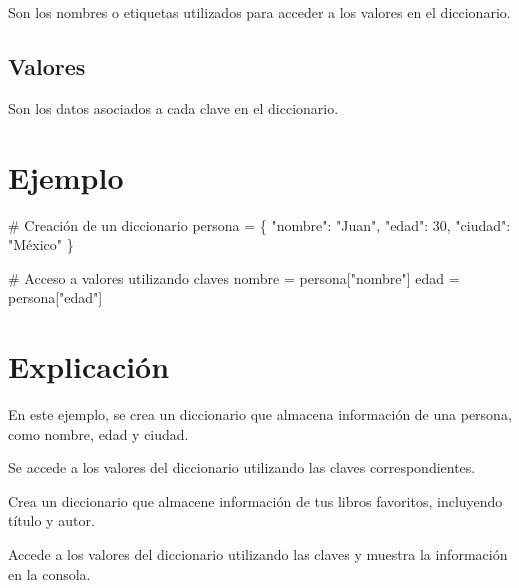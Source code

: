 \documentclass[
  a4paper,
  DIV=11,
  numbers=noendperiod,
  onepage,
  openany]{scrreprt}
\newenvironment{Shaded}{\begin{snugshade}}{\end{snugshade}}
\newcommand{\CommentTok}[1]{\textcolor[rgb]{0.37,0.37,0.37}{#1}}
\newcommand{\DecValTok}[1]{\textcolor[rgb]{0.68,0.00,0.00}{#1}}
\newcommand{\NormalTok}[1]{\textcolor[rgb]{0.00,0.23,0.31}{#1}}
\newcommand{\OperatorTok}[1]{\textcolor[rgb]{0.37,0.37,0.37}{#1}}
\newcommand{\StringTok}[1]{\textcolor[rgb]{0.13,0.47,0.30}{#1}}
\begin{document}
Son los nombres o etiquetas utilizados para acceder a los valores en el
diccionario.

\hypertarget{valores}{%
\subsection{Valores}\label{valores}}

Son los datos asociados a cada clave en el diccionario.

\hypertarget{ejemplo-24}{%
\section{Ejemplo}\label{ejemplo-24}}

\begin{Shaded}
\begin{Highlighting}[]
\CommentTok{\# Creación de un diccionario}
\NormalTok{persona }\OperatorTok{=}\NormalTok{ \{}
    \StringTok{"nombre"}\NormalTok{: }\StringTok{"Juan"}\NormalTok{,}
    \StringTok{"edad"}\NormalTok{: }\DecValTok{30}\NormalTok{,}
    \StringTok{"ciudad"}\NormalTok{: }\StringTok{"México"}
\NormalTok{\}}

\CommentTok{\# Acceso a valores utilizando claves}
\NormalTok{nombre }\OperatorTok{=}\NormalTok{ persona[}\StringTok{"nombre"}\NormalTok{]}
\NormalTok{edad }\OperatorTok{=}\NormalTok{ persona[}\StringTok{"edad"}\NormalTok{]}
\end{Highlighting}
\end{Shaded}

\hypertarget{explicaciuxf3n-24}{%
\section{Explicación}\label{explicaciuxf3n-24}}

En este ejemplo, se crea un diccionario que almacena información de una
persona, como nombre, edad y ciudad.

Se accede a los valores del diccionario utilizando las claves
correspondientes.

\begin{tcolorbox}[enhanced jigsaw, colbacktitle=quarto-callout-important-color!10!white, toprule=.15mm, leftrule=.75mm, titlerule=0mm, opacityback=0, rightrule=.15mm, opacitybacktitle=0.6, breakable, left=2mm, coltitle=black, title=\textcolor{quarto-callout-important-color}{\faExclamation}\hspace{0.5em}{Actividad Práctica}, toptitle=1mm, bottomtitle=1mm, arc=.35mm, bottomrule=.15mm, colback=white, colframe=quarto-callout-important-color-frame]

Crea un diccionario que almacene información de tus libros favoritos,
incluyendo título y autor.

Accede a los valores del diccionario utilizando las claves y muestra la
información en la consola.

\end{tcolorbox}
\end{document}
